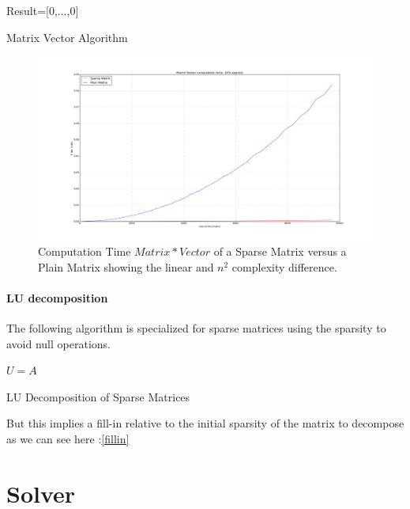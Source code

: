 \documentclass[a4paper]{report}
\begin{document}
\begin{algorithm}[H]
 Result=[0,...,0]\;
 \caption{Matrix Vector Algorithm}
\end{algorithm}

\begin{figure}[H]
\begin{center}
\includegraphics[scale=0.20]{matrix_vector_time.png}\caption{Computation Time $Matrix*Vector$ of a Sparse Matrix versus a Plain Matrix showing the linear and $n^2$ complexity difference.}
\end{center}
\end{figure}


\subsubsection{LU decomposition}
The following algorithm is specialized for sparse matrices using the sparsity to avoid null operations.

\begin{algorithm}[H]
 $U=A$\;
 \caption{LU Decomposition of Sparse Matrices}
\end{algorithm}
But this implies a fill-in relative to the initial sparsity of the matrix to decompose as we can see here :\ref{fillin}



\chapter{Solver}
\end{document}
